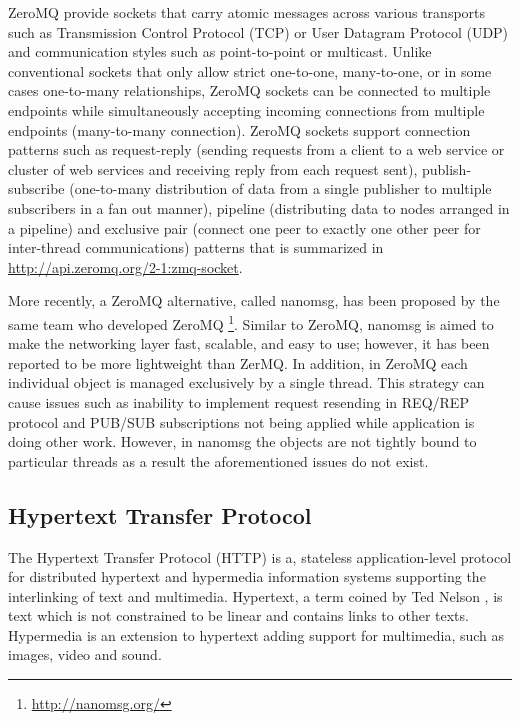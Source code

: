 \documentclass[a4paper,11pt,twoside]{article}
\begin{document}
ZeroMQ provide sockets that carry atomic messages across various transports such as Transmission Control Protocol (TCP) or User Datagram Protocol (UDP) and communication styles such as point-to-point or multicast. Unlike conventional sockets that only allow strict one-to-one, many-to-one, or in some cases one-to-many relationships, ZeroMQ sockets can be connected to multiple endpoints while simultaneously accepting incoming connections from multiple endpoints (many-to-many connection). ZeroMQ sockets support connection patterns such as request-reply (sending requests from a client to a web service or cluster of web services and receiving reply from each request sent), publish-subscribe (one-to-many distribution of data from a single publisher to multiple subscribers in a fan out manner), pipeline (distributing data to nodes arranged in a pipeline) and exclusive pair (connect one peer to exactly one other peer for inter-thread communications) patterns that is summarized in \url{http://api.zeromq.org/2-1:zmq-socket}.      

More recently, a ZeroMQ alternative, called nanomsg, has been proposed by the same team who developed ZeroMQ \footnote{\label{nanomsg} \url{http://nanomsg.org/}}. Similar to ZeroMQ, nanomsg is aimed to make the networking layer fast, scalable, and easy to use; however, it has been reported to be more lightweight than ZerMQ. In addition, in ZeroMQ each individual object is managed exclusively by a single thread. This strategy can cause issues such as inability to implement request resending in REQ/REP protocol and PUB/SUB subscriptions not being applied while application is doing other work. However, in nanomsg the objects are not tightly bound to particular threads as a result the aforementioned issues do not exist. 


\subsection{Hypertext Transfer Protocol} \label{HTTP}
The Hypertext Transfer Protocol (HTTP) is a, stateless application-level protocol for distributed hypertext and hypermedia information systems supporting the interlinking of text and multimedia.  Hypertext, a term coined by Ted Nelson \cite{hypertext}, is text which is not constrained to be linear and contains links to other texts.  Hypermedia is an extension to hypertext adding support for multimedia, such as images, video and sound.
\end{document}

